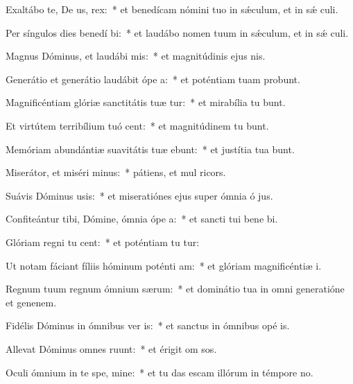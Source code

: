 \item Exaltábo te, De us, rex:~* et benedícam nómini tuo in sǽculum, et in sǽ culi.
\item Per síngulos dies benedí bi:~* et laudábo nomen tuum in sǽculum, et in sǽ culi.
\item Magnus Dóminus, et laudábi mis:~* et magnitúdinis ejus   nis.
\item Generátio et generátio laudábit ópe a:~* et poténtiam tuam probunt.
\item Magnificéntiam glóriæ sanctitátis tuæ tur:~* et mirabília tu bunt.
\item Et virtútem terribílium tuó cent:~* et magnitúdinem tu bunt.
\item Memóriam abundántiæ suavitátis tuæ ebunt:~* et justítia tua bunt.
\item Miserátor, et miséri minus:~* pátiens, et mul ricors.
\item Suávis Dóminus usis:~* et miseratiónes ejus super ómnia ó jus.
\item Confiteántur tibi, Dómine, ómnia ópe a:~* et sancti tui bene bi.
\item Glóriam regni tu cent:~* et poténtiam tu tur:
\item Ut notam fáciant fíliis hóminum poténti am:~* et glóriam magnificéntiæ  i.
\item Regnum tuum regnum ómnium særum:~* et dominátio tua in omni generatióne et genenem.
\item Fidélis Dóminus in ómnibus ver is:~* et sanctus in ómnibus opé is.
\item Allevat Dóminus omnes  ruunt:~* et érigit om sos.
\item Oculi ómnium in te spe, mine:~* et tu das escam illórum in témpore no.
